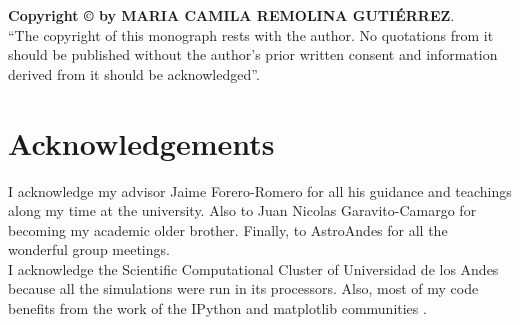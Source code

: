 \vspace{4in}
\noindent \textbf{Copyright \copyright{} by MARIA CAMILA REMOLINA GUTI\'ERREZ}.\\
``The copyright of this monograph rests with the author.  No quotations
from it should be published without the author's prior written consent
and information derived from it should be acknowledged''.

\chapter*{Acknowledgements}
I acknowledge my advisor Jaime Forero-Romero for all his guidance and teachings along my time at the university. Also to Juan Nicolas Garavito-Camargo for becoming my academic older brother. Finally, to AstroAndes for all the wonderful group meetings. \\

I acknowledge the Scientific Computational Cluster of Universidad de los Andes because all the simulations were run in its processors. Also, most of my code benefits from the work of the IPython and matplotlib communities \cite{IPython,matplotlib}.\\

\tableofcontents
\clearpage